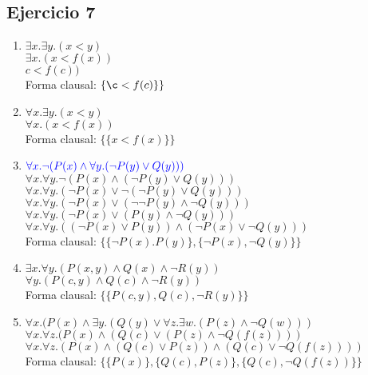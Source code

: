 \documentclass[10pt,a4paper]{article}
\begin{document}
\subsection{Ejercicio 7}
    \begin{enumerate}
        \item 
        $\exists x. \exists y. (x<y)$ \\
        $\exists x. (x<f(x))$ \\
        $c<f(c))$ \\
        Forma clausal: $\{\c<f(c)\}\}$
        \item 
        $\forall x. \exists y. (x<y)$ \\
        $\forall x. (x<f(x))$ \\
        Forma clausal: $\{\{x<f(x)\}\}$
        \item 
        ${\color{blue}\forall x. \neg(P(x) \wedge \forall y.(\neg P(y) \vee Q(y)))}$ \\
        $\forall x. \forall y. \neg(P(x) \wedge (\neg P(y) \vee Q(y)))$ \\
        $\forall x. \forall y. (\neg P(x) \vee \neg(\neg P(y) \vee Q(y)))$ \\
        $\forall x. \forall y. (\neg P(x) \vee (\neg \neg P(y) \wedge \neg Q(y)))$ \\
        $\forall x. \forall y. (\neg P(x) \vee (P(y) \wedge \neg Q(y)))$ \\
        $\forall x. \forall y. ( (\neg P(x) \vee P(y)) \wedge (\neg P(x) \vee \neg Q(y) ) )$ \\
        Forma clausal: $\{\{ \neg P(x). P(y)\},\{ \neg P(x), \neg Q(y)\}\}$
        \item 
        $\exists x. \forall y. (P(x,y) \wedge Q(x) \wedge \neg R(y))$ \\
        $\forall y. (P(c,y) \wedge Q(c) \wedge \neg R(y))$ \\
        Forma clausal: $\{\{P(c,y), Q(c), \neg R(y)\}\}$
        \item 
        $\forall x. (P(x) \wedge \exists y. (Q(y) \vee \forall z. \exists w. (P(z) \wedge \neg Q(w)))$ \\
        $\forall x. \forall z. (P(x) \wedge (Q(c) \vee (P(z) \wedge \neg Q(f(z))))$ \\
        $\forall x. \forall z. (P(x) \wedge (Q(c) \vee P(z) ) \wedge (Q(c) \vee \neg Q(f(z)) ) )$ \\
        Forma clausal: $\{\{ P(x)\} , \{Q(c), P(z)\} , \{Q(c), \neg Q(f(z))\} \}$
    \end{enumerate}
\end{document}

